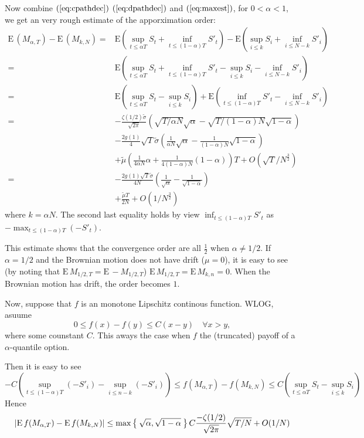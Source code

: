 \documentclass[11pt]{book}
\def\tmu{{\widetilde{\mu}}}
\def\tsigma{{\widetilde{\sigma}}}
\def\abs#1{{\left|#1\right|}}
\def\E{{\mathrm{E}\,}}
\def\EE#1{{{\mathrm{E}}\left(#1\right)}}
\begin{document}
Now combine $(\ref{eq:cpathdec})$ $(\ref{eq:dpathdec})$ and $(\ref{eq:maxest})$, for $0 < \alpha < 1$,
we get an very rough estimate of the apporximation order:
\begin{equation}
\begin{split}
\E (M_{\alpha,T}) - \E (M_{k,N})
=& \EE{\sup_{t\leq \alpha{T}} S_t +\inf_{t \leq (1-\alpha)T}S'_t}
- \EE{\sup_{i\leq k} S_i+\inf_{i\leq N-k} S'_i}\\
=& \EE{\sup_{t\leq \alpha{T}} S_t +\inf_{t \leq (1-\alpha)T}S'_t
-  \sup_{i\leq k} S_i-\inf_{i\leq N-k} S'_i} \\
= &  \EE{\sup_{t\leq \alpha{T}} S_t - \sup_{i\leq k} S_i} +
\EE{\inf_{t \leq (1-\alpha)T} S'_t-\inf_{i\leq N-k} S'_i}\\
=& -\frac{\zeta(1/2) \tsigma}{\sqrt{2\pi}}\left(\sqrt{T/\alpha N}
\sqrt{\alpha} - \sqrt{T/(1-\alpha)N}\sqrt{1-\alpha}\right) \\
& - \frac{2g(1)}{4}\sqrt{T} \tsigma
\left(\frac{1}{\alpha N} \sqrt{\alpha}
  - \frac{1}{(1-\alpha)N}\sqrt{1-\alpha}\right) \\
& + \tmu \left( \frac{1}{4\alpha N}\alpha
  +\frac{1}{4(1-\alpha)N}(1-\alpha)\right)T
+ O(\sqrt{T}/N^{\frac{3}{2}}) \\
=& - \frac{2g(1)\sqrt{T}\tsigma}{4N}
\left(\frac{1}{\sqrt{\alpha}}
  - \frac{1}{\sqrt{1-\alpha}}\right) \\
& + \frac{\tmu T}{2 N}
+ O(1/N^{\frac{3}{2}})
\end{split}
\end{equation}
where $k = \alpha N$.
The second last equality holds by view $\inf_{t\leq (1-\alpha)T} S'_t$ as
$-\max_{t\leq (1-\alpha)T} (-S'_t)$.

This estimate shows that the convergence order
are all $\frac{1}{2}$ when $\alpha \neq 1/2$. If $\alpha=1/2$ and the
Brownian motion does not have  drift ($\mu=0$), it is easy to see
(by noting that
$\E M_{1/2,T} = \E -M_{1/2,T}$) $\E M_{1/2,T} = \E M_{k,n} = 0$.
When the Brownian motion has drift, the order becomes $1$.

Now, suppose that $f$ is an monotone Lipschitz continous function.
WLOG, asuume
\begin{equation}\label{eq:lips}
0 \leq f(x)-f(y) \leq C (x-y) \quad \forall x>y,
\end{equation}
where some counstant $C$. This aways the case when $f$ the
(truncated) payoff of a $\alpha$-quantile option.

Then it is easy to see
\[
-C\left( \sup_{t\leq (1-\alpha)T} (-S'_i)-\sup_{i\leq n-k} (-S'_i)\right)
 \leq f(M_{\alpha,T}) - f(M_{k,N})
\leq  C \left(\sup_{t\leq \alpha{T}} S_t - \sup_{i\leq k} S_i\right)
\]
Hence
\[
\abs{\E f(M_{\alpha,T}) - \E f(M_{k,N})}
\leq \max\Set{\sqrt{\alpha}, \sqrt{1-\alpha}}
C\frac{-\zeta(1/2)}{\sqrt{2\pi}}\sqrt{T/N}  + O(1/N)
\]
\end{document}
